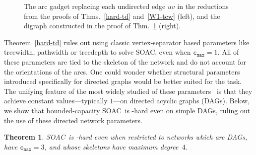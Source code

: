 \documentclass[letterpaper]{article} %
\newtheorem{theorem}{Theorem}
\newcommand{\problem}{{\sc SOAC}\xspace} %
\newcommand{\cmax}{\mathtt{c_{max}}}
\begin{document}
\begin{figure}
{
}
\caption{The arc gadget replacing each undirected edge $uv$ in the reductions from the proofs of Thms.~\ref{hard-td} and~\ref{W1-tcw} (left), and the digraph constructed in the proof of Thm.~\ref{hard-dags} (right).}
\label{fig:td-1-in-3}
\end{figure}

Theorem~\ref{hard-td} rules out using classic vertex-separator based parameters like treewidth, pathwidth or treedepth to solve SOAC, even when $\cmax=1$. All of these parameters are tied to the skeleton of the network and do not account for the orientations of the arcs. One could wonder whether structural parameters introduced specifically for directed graphs would be better suited for the task. The unifying feature of the most widely studied of these parameters~\cite{JohnsonRST01,hunter2008digraph,BerwangerDHKO12} is that they achieve constant values---typically $1$---on directed acyclic graphs (DAGs). Below, we show that bounded-capacity \problem\ is \NP-hard even on simple DAGs, ruling out the use of these directed network parameters.

\begin{theorem}
\label{hard-dags}
\problem\ is \NP-hard even when restricted to networks which are DAGs, have $\cmax=3$, and whose skeletons have maximum degree~$4$.
\end{theorem}
\end{document}
